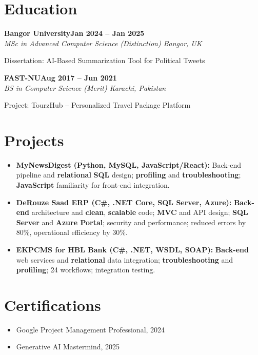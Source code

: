 \documentclass[letterpaper,10pt]{article}
\newcommand{\headingBf}[2]{
  \hspace{10pt}\textbf{#1}\hfill\textbf{#2}\\
}
\newcommand{\headingIt}[2]{
  \hspace{10pt}\textit{#1}\hfill\textit{#2}\\
}
\newenvironment{resume_list}{
  \vspace{-7pt}
  \begin{itemize}[itemsep=-2px, parsep=1pt, leftmargin=30pt]
}{
  \end{itemize}
}
\begin{document}
\section{Education}

\headingBf{Bangor University}{Jan 2024 -- Jan 2025}
\headingIt{MSc in Advanced Computer Science (Distinction) \hfill Bangor, UK}{}
\begin{resume_list}
    \item Dissertation: AI-Based Summarization Tool for Political Tweets
\end{resume_list}

\headingBf{FAST-NU}{Aug 2017 -- Jun 2021}
\headingIt{BS in Computer Science (Merit) \hfill Karachi, Pakistan}{}
\begin{resume_list}
    \item Project: TourzHub -- Personalized Travel Package Platform
\end{resume_list}

\section{Projects}
\begin{itemize}
    \setlength\itemsep{3pt}
    \item \textbf{MyNewsDigest (Python, MySQL, JavaScript/React):} Back-end pipeline and \textbf{relational} \textbf{SQL} design; \textbf{profiling} and \textbf{troubleshooting}; \textbf{JavaScript} familiarity for front-end integration.
    \item \textbf{DeRouze Saad ERP (C\#, .NET Core, SQL Server, Azure):} \textbf{Back-end} architecture and \textbf{clean}, \textbf{scalable} code; \textbf{MVC} and API design; \textbf{SQL Server} and \textbf{Azure Portal}; security and performance; reduced errors by 80\%, operational efficiency by 30\%.
    \item \textbf{EKPCMS for HBL Bank (C\#, .NET, WSDL, SOAP):} \textbf{Back-end} web services and \textbf{relational} data integration; \textbf{troubleshooting} and \textbf{profiling}; 24 workflows; integration testing.
\end{itemize}

\section{Certifications}
\begin{itemize}
    \item Google Project Management Professional, 2024
    \item Generative AI Mastermind, 2025
\end{itemize}

\vspace*{\fill}
\end{document}
